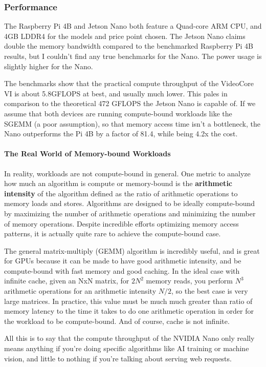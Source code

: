 \documentclass[12pt]{article}
\begin{document}
\subsubsection{Performance}
The Raspberry Pi 4B and Jetson Nano both feature a Quad-core ARM CPU, and 4GB LDDR4 for the models and price point chosen. The Jetson Nano claims double the memory bandwidth compared to the benchmarked Raspberry Pi 4B results, but I couldn't find any true benchmarks for the Nano. The power usage is slightly higher for the Nano.

The benchmarks show that the practical compute throughput of the VideoCore VI is about 5.8GFLOPS at best, and usually much lower. This pales in comparison to the theoretical 472 GFLOPS the Jetson Nano is capable of.  If we assume that both devices are running compute-bound workloads like the SGEMM (a poor assumption), so that memory access time isn't a bottleneck, the Nano outperforms the Pi 4B by a factor of 81.4, while being 4.2x the cost. 

\paragraph{The Real World of Memory-bound Workloads}
In reality, workloads are not compute-bound in general. One metric to analyze how much an algorithm is compute or memory-bound is the \textbf{arithmetic intensity} of the algorithm defined as the ratio of arithmetic operations to memory loads and stores. Algorithms are designed to be ideally compute-bound by maximizing the number of arithmetic operations and minimizing the number of memory operations. Despite incredible efforts optimizing memory access patterns, it is actually quite rare to achieve the compute-bound case. 

The general matrix-multiply (GEMM) algorithm is incredibly useful, and is great for GPUs because it can be made to have good arithmetic intensity, and be compute-bound with fast memory and good caching. In the ideal case with infinite cache, given an NxN matrix, for $2N^2$ memory reads, you perform $N^3$ arithmetic operations for an arithmetic intensity $N/2$, so the best case is very large matrices. In practice, this value must be much much greater than ratio of memory latency to the time it takes to do one arithmetic operation in order for the workload to be compute-bound. And of course, cache is not infinite.

All this is to say that the compute throughput of the NVIDIA Nano only really means anything if you're doing specific algorithms like AI training or machine vision, and little to nothing if you're talking about serving web requests.
\end{document}
